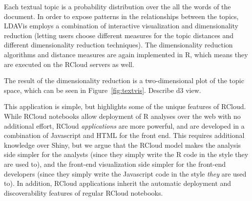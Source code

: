 Each textual topic is a probability distribution over the all the
words of the document. In order to expose patterns in the
relationships between the topics, LDAVis employs a combination of
interactive visualization and dimensionality reduction (letting users
choose different measures for the topic distances and different
dimensionality reduction techniques). The dimensionality reduction
algorithms and distance measures are again implemented in R, which
means they are executed on the RCloud servers as well.

The result of the dimensionality reduction is a two-dimensional plot
of the topic space, which can be seen in
Figure~\ref{fig:textvis}. Describe d3 view.

This application is simple, but highlights some of the unique features
of RCloud. While RCloud notebooks allow deployment of R analyses over
the web with no additional effort, RCloud \emph{applications} are more
powerful, and are developed in a combination of Javascript and HTML
for the front end. This requires additional knowledge over Shiny, but
we argue that the RCloud model makes the analysis side simpler for the
analysts (since they simply write the R code in the style they are
used to), and the front-end visualization side simpler for the
front-end developers (since they simply write the Javascript code in
the style \emph{they} are used to). In addition, RCloud applications
inherit the automatic deployment and discoverability features of
regular RCloud notebooks.




